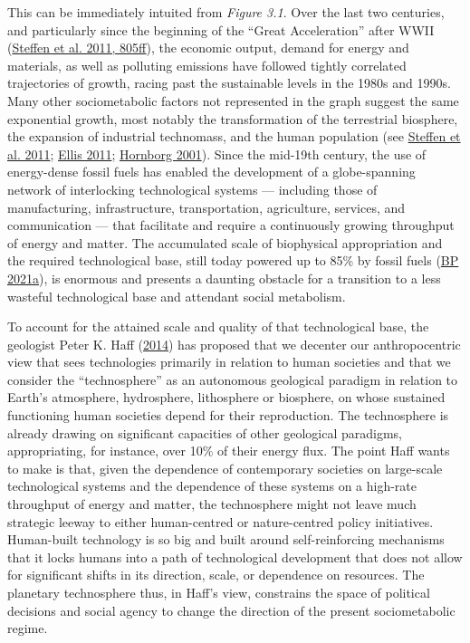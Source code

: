 \documentclass[a4paper, nobind]{templates/ociamthesis}
\begin{document}
This can be immediately intuited from \emph{Figure 3.1}. Over the last two centuries, and particularly since the beginning of the ``Great Acceleration'' after WWII (\protect\hyperlink{ref-steffen_anthropocene_2011}{Steffen et al. 2011, 805ff}), the economic output, demand for energy and materials, as well as polluting emissions have followed tightly correlated trajectories of growth, racing past the sustainable levels in the 1980s and 1990s. Many other sociometabolic factors not represented in the graph suggest the same exponential growth, most notably the transformation of the terrestrial biosphere, the expansion of industrial technomass, and the human population (see \protect\hyperlink{ref-steffen_anthropocene_2011}{Steffen et al. 2011}; \protect\hyperlink{ref-ellis_anthropogenic_2011}{Ellis 2011}; \protect\hyperlink{ref-hornborg_power_2001}{Hornborg 2001}). Since the mid-19th century, the use of energy-dense fossil fuels has enabled the development of a globe-spanning network of interlocking technological systems --- including those of manufacturing, infrastructure, transportation, agriculture, services, and communication --- that facilitate and require a continuously growing throughput of energy and matter. The accumulated scale of biophysical appropriation and the required technological base, still today powered up to 85\% by fossil fuels (\protect\hyperlink{ref-bp_energy_2021}{BP 2021a}), is enormous and presents a daunting obstacle for a transition to a less wasteful technological base and attendant social metabolism.

To account for the attained scale and quality of that technological base, the geologist Peter K. Haff (\protect\hyperlink{ref-haff_technology_2014}{2014}) has proposed that we decenter our anthropocentric view that sees technologies primarily in relation to human societies and that we consider the ``technosphere'' as an autonomous geological paradigm in relation to Earth's atmosphere, hydrosphere, lithosphere or biosphere, on whose sustained functioning human societies depend for their reproduction. The technosphere is already drawing on significant capacities of other geological paradigms, appropriating, for instance, over 10\% of their energy flux. The point Haff wants to make is that, given the dependence of contemporary societies on large-scale technological systems and the dependence of these systems on a high-rate throughput of energy and matter, the technosphere might not leave much strategic leeway to either human-centred or nature-centred policy initiatives. Human-built technology is so big and built around self-reinforcing mechanisms that it locks humans into a path of technological development that does not allow for significant shifts in its direction, scale, or dependence on resources. The planetary technosphere thus, in Haff's view, constrains the space of political decisions and social agency to change the direction of the present sociometabolic regime.
\end{document}
